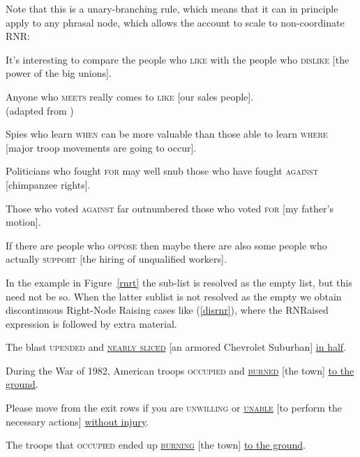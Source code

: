 \documentclass[output=paper
                ,modfonts
                ,nonflat
	        ,collection
	        ,collectionchapter
	        ,collectiontoclongg
 	        ,biblatex
                ,babelshorthands
                ,newtxmath
                ,draftmode
                ,colorlinks, citecolor=brown
]{./langsci/langscibook}
\begin{document}
\noindent
Note that this is a unary-branching rule, which means that it can in principle apply to any phrasal node, which allows the account to scale to non-coordinate RNR:

\begin{exe}
\ex \begin{xlista}
\ex  It's interesting to compare the people who \textsc{like} with the people
       who \textsc{dislike} [the power of the big unions].\\
       \citep[550]{hudson}

 \ex Anyone  who \textsc{meets} really comes to \textsc{like} [our sales people].\\
 (adapted from \citet{
williams})\label{will}


\ex   Spies who learn \textsc{when} can be more valuable than those
able to learn \textsc{where} [major troop movements are going to occur].

\ex Politicians who fought \textsc{for} may well snub those
 who have fought \textsc{against} [chimpanzee rights]. \\
\citep{postal94}

\ex Those who voted \textsc{against} far outnumbered those who
voted  \textsc{for} [my father's motion].\\
\citep[1344]{rodney2}


\ex If there are people who \textsc{oppose} then maybe there are also some
  people who actually \textsc{support}  [the hiring of unqualified
  workers].\\
  \citep{chavesrnr}

\end{xlista}


\end{exe}








In the example in Figure~\ref{rnrt}  the sub-list  is resolved as the empty list, but this need not be so. When the latter sublist is not resolved as the empty we obtain discontinuous Right-Node Raising cases like (\ref{disrnr}), 
where the RNRaised expression is followed by extra material.


\begin{exe}
\ex \begin{xlista}
\ex The blast \textsc{upended} and \underline{\textsc{nearly sliced}} [an armored Chevrolet Suburban] \underline{in half}.

\ex During the War of 1982, American troops
\textsc{occupied}  and \underline{\textsc{burned}} [the town] \underline{to the ground}.

\ex Please move from the exit rows if you are \textsc{unwilling} or \underline{\textsc{unable}}
 [to perform the necessary actions] \underline{without injury}.

\ex The troops that \textsc{occupied} ended up \underline{\textsc{burning}}
[the town] \underline{to the ground}.

\end{xlista}\label{disrnr}
\end{exe}
\end{document}
